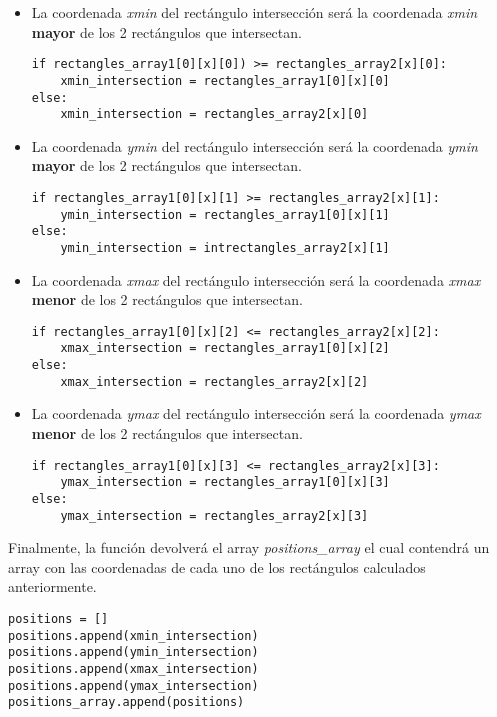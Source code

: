 \documentclass[a4paper, 12pt, spanish, chapterprefix, numbers=noenddot]{book}
\begin{document}
\begin{itemize}
\item La coordenada \textit{xmin} del rectángulo intersección será la coordenada \textit{xmin} \textbf{mayor} de los 2 rectángulos que intersectan.\\
\begin{lstlisting}[frame=single]
if rectangles_array1[0][x][0]) >= rectangles_array2[x][0]:
	xmin_intersection = rectangles_array1[0][x][0]
else:
	xmin_intersection = rectangles_array2[x][0]
\end{lstlisting}
\item La coordenada \textit{ymin} del rectángulo intersección será la coordenada \textit{ymin} \textbf{mayor} de los 2 rectángulos que intersectan.\\
\begin{lstlisting}[frame=single]
if rectangles_array1[0][x][1] >= rectangles_array2[x][1]:
	ymin_intersection = rectangles_array1[0][x][1]
else:
	ymin_intersection = intrectangles_array2[x][1]
\end{lstlisting}
\item La coordenada \textit{xmax} del rectángulo intersección será la coordenada \textit{xmax} \textbf{menor} de los 2 rectángulos que intersectan.\\
\begin{lstlisting}[frame=single]
if rectangles_array1[0][x][2] <= rectangles_array2[x][2]:
	xmax_intersection = rectangles_array1[0][x][2]
else:
	xmax_intersection = rectangles_array2[x][2]
\end{lstlisting}
\item La coordenada \textit{ymax} del rectángulo intersección será la coordenada \textit{ymax} \textbf{menor} de los 2 rectángulos que intersectan.\\
\begin{lstlisting}[frame=single]
if rectangles_array1[0][x][3] <= rectangles_array2[x][3]:
	ymax_intersection = rectangles_array1[0][x][3]
else:
	ymax_intersection = rectangles_array2[x][3]
\end{lstlisting}
\end{itemize}

Finalmente, la función devolverá el array \textit{positions\_array} el cual contendrá un array con las coordenadas de cada uno de los rectángulos calculados anteriormente.\\

\begin{lstlisting}[frame=single]
positions = []
positions.append(xmin_intersection)
positions.append(ymin_intersection)
positions.append(xmax_intersection)
positions.append(ymax_intersection)
positions_array.append(positions)
\end{lstlisting}
\end{document}
